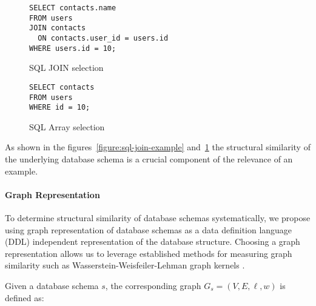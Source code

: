 \begin{figure}[ht]
  \vspace{1em}
  \hfill
  \begin{minipage}[b]{0.45\linewidth}
    \begin{verbatim}
SELECT contacts.name
FROM users
JOIN contacts
  ON contacts.user_id = users.id
WHERE users.id = 10;
    \end{verbatim}
    \caption{SQL JOIN selection}
    \label{figure:sql-join-example}
  \end{minipage}
  \hfill
  \begin{minipage}[b]{0.35\linewidth}
    \centering
    \begin{verbatim}
SELECT contacts
FROM users
WHERE id = 10;
    \end{verbatim}
    \vspace{1.3em}
    \caption{SQL Array selection}
    \label{figure:sql-array-example}
  \end{minipage}
  \hfill
  \vspace{1em}
\end{figure}


As shown in the figures~\ref{figure:sql-join-example} and~\ref{figure:sql-array-example}
the structural similarity of the underlying database schema is a crucial component
of the relevance of an example.

\paragraph{Graph Representation}

To determine structural similarity of database schemas systematically, we propose
using graph representation of database schemas as a data definition language (DDL)
independent representation of the database structure. Choosing a graph
representation allows us to leverage established methods for measuring graph similarity
such as Wasserstein-Weisfeiler-Lehman graph kernels \citep{WWL}. %

Given a database schema $s$, the corresponding graph $G_s = (V, E, \ell, w)$ is defined as:

